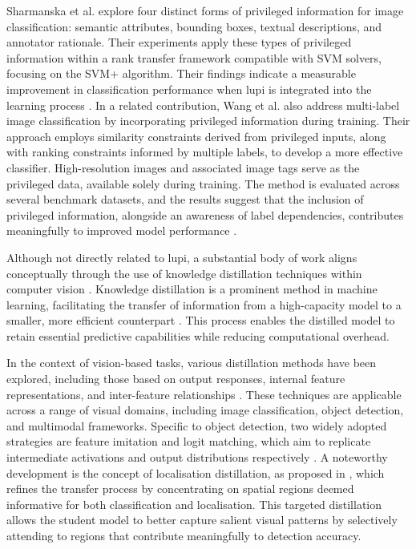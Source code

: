 Sharmanska et al. \cite{learning2rank, learning2rank2} explore four distinct forms of privileged information for image classification: semantic attributes, bounding boxes, textual descriptions, and annotator rationale. Their experiments apply these types of privileged information within a rank transfer framework compatible with SVM solvers, focusing on the SVM+ algorithm. Their findings indicate a measurable improvement in classification performance when \gls{lupi} is integrated into the learning process \cite{learning2rank, learning2rank2}.
In a related contribution, Wang et al. \cite{lupi_classification} also address multi-label image classification by incorporating privileged information during training. Their approach employs similarity constraints derived from privileged inputs, along with ranking constraints informed by multiple labels, to develop a more effective classifier. High-resolution images and associated image tags serve as the privileged data, available solely during training. The method is evaluated across several benchmark datasets, and the results suggest that the inclusion of privileged information, alongside an awareness of label dependencies, contributes meaningfully to improved model performance \cite{lupi_classification}.

Although not directly related to \gls{lupi}, a substantial body of work aligns conceptually through the use of knowledge distillation techniques within computer vision \cite{distillation1, distillation2}. Knowledge distillation is a prominent method in machine learning, facilitating the transfer of information from a high-capacity model to a smaller, more efficient counterpart \cite{hinton_distillation}. This process enables the distilled model to retain essential predictive capabilities while reducing computational overhead.

In the context of vision-based tasks, various distillation methods have been explored, including those based on output responses, internal feature representations, and inter-feature relationships \cite{distillation1}. These techniques are applicable across a range of visual domains, including image classification, object detection, and multimodal frameworks. Specific to object detection, two widely adopted strategies are feature imitation and logit matching, which aim to replicate intermediate activations and output distributions respectively \cite{distillation2}.
A noteworthy development is the concept of localisation distillation, as proposed in \cite{distillation2}, which refines the transfer process by concentrating on spatial regions deemed informative for both classification and localisation. This targeted distillation allows the student model to better capture salient visual patterns by selectively attending to regions that contribute meaningfully to detection accuracy.

